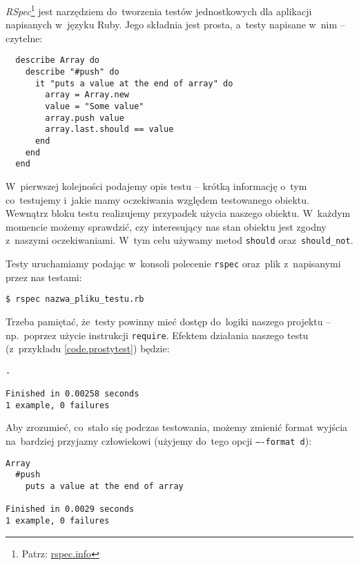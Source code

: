 \textit{RSpec}\footnote{Patrz: \url{rspec.info}} jest narzędziem do~tworzenia testów jednostkowych dla aplikacji napisanych w~języku Ruby. Jego składnia jest prosta, a~testy napisane w~nim -- czytelne:

   \label{code.prostytest}
  \begin{lstlisting}
  describe Array do
    describe "#push" do
      it "puts a value at the end of array" do
        array = Array.new
        value = "Some value"
        array.push value
        array.last.should == value
      end
    end
  end
  \end{lstlisting}

W~pierwszej kolejności podajemy opis testu -- krótką informację o~tym co~testujemy i~jakie mamy oczekiwania względem testowanego obiektu. Wewnątrz bloku testu realizujemy przypadek użycia naszego obiektu. W~każdym momencie możemy sprawdzić, czy interesujący nas stan obiektu jest zgodny z~naszymi oczekiwaniami. W~tym celu używamy metod \texttt{should} oraz~\texttt{should\_not}.


Testy uruchamiamy podając w~konsoli polecenie \texttt{rspec} oraz~plik z~napisanymi przez nas testami:

\mbox{\texttt{\$ rspec nazwa\_pliku\_testu.rb}}

Trzeba pamiętać, że~testy powinny mieć dostęp do~logiki naszego projektu -- np.~poprzez użycie instrukcji \texttt{require}. Efektem działania naszego testu (z~przykładu \ref{code.prostytest}) będzie:

  \begin{lstlisting}
.

Finished in 0.00258 seconds
1 example, 0 failures
  \end{lstlisting}

Aby zrozumieć, co~stało się podczas testowania, możemy zmienić format wyjścia na~bardziej przyjazny człowiekowi (użyjemy do~tego opcji \texttt{----format d}):

  \begin{lstlisting}
Array
  #push
    puts a value at the end of array

Finished in 0.0029 seconds
1 example, 0 failures
\end{lstlisting}

